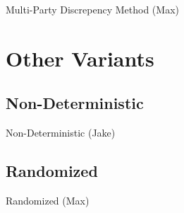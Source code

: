 \documentclass{beamer}
\begin{document}
\begin{frame}{Multi-Party Discrepency Method (Max)}
\TODO
\end{frame}

\section{Other Variants}

\subsection{Non-Deterministic}

\begin{frame}{Non-Deterministic (Jake)}
\TODO
\end{frame}

\subsection{Randomized}

\begin{frame}{Randomized (Max)}
\TODO
\end{frame}
\end{document}
